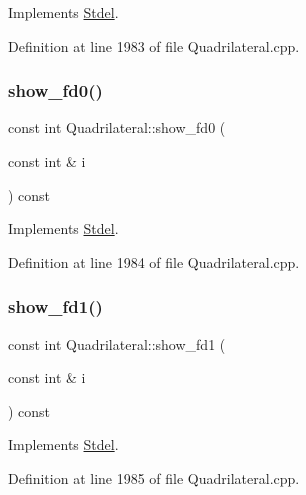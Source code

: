 Implements \hyperlink{classStdel_ae76b0893dabd93ae9f86a9ed445852ba}{Stdel}.



Definition at line 1983 of file Quadrilateral.\+cpp.

\mbox{\label{classQuadrilateral_a37f35e0253b296804417fdbb087d155c}} 
\subsubsection{\texorpdfstring{show\+\_\+fd0()}{show\_fd0()}}
{\footnotesize\ttfamily const int Quadrilateral\+::show\+\_\+fd0 (\begin{DoxyParamCaption}\item[{const int \&}]{i }\end{DoxyParamCaption}) const\hspace{0.3cm}{\ttfamily [virtual]}}



Implements \hyperlink{classStdel_a0e05ccae64925915af5f07c91d61c7bc}{Stdel}.



Definition at line 1984 of file Quadrilateral.\+cpp.

\mbox{\label{classQuadrilateral_a679e364920cf90d28114bf85a525408f}} 
\subsubsection{\texorpdfstring{show\+\_\+fd1()}{show\_fd1()}}
{\footnotesize\ttfamily const int Quadrilateral\+::show\+\_\+fd1 (\begin{DoxyParamCaption}\item[{const int \&}]{i }\end{DoxyParamCaption}) const\hspace{0.3cm}{\ttfamily [virtual]}}



Implements \hyperlink{classStdel_af4a394fae421489159f40ddcb736353b}{Stdel}.



Definition at line 1985 of file Quadrilateral.\+cpp.

\mbox{\label{classQuadrilateral_a32796d1fcdbc5d7372c9b5c08c7d5a61}} 
